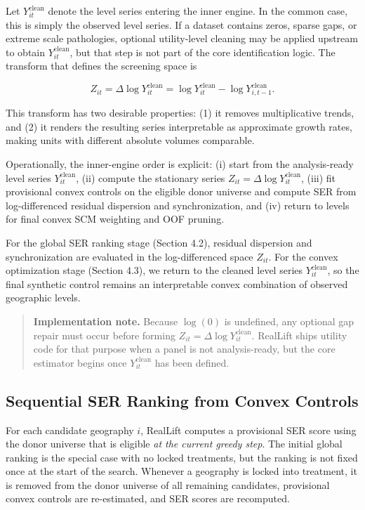 \documentclass[11pt]{article}
\begin{document}
Let $Y_{it}^{\mathrm{clean}}$ denote the level series entering the inner engine. In the common case, this is simply the observed level series. If a dataset contains zeros, sparse gaps, or extreme scale pathologies, optional utility-level cleaning may be applied upstream to obtain $Y_{it}^{\mathrm{clean}}$, but that step is not part of the core identification logic. The transform that defines the screening space is

\[
Z_{it} = \Delta \log Y_{it}^{\mathrm{clean}} = \log Y_{it}^{\mathrm{clean}} - \log Y_{i,t-1}^{\mathrm{clean}}.
\]

This transform has two desirable properties: (1) it removes multiplicative trends, and (2) it renders the resulting series interpretable as approximate growth rates, making units with different absolute volumes comparable.

Operationally, the inner-engine order is explicit: (i) start from the analysis-ready level series $Y_{it}^{\mathrm{clean}}$, (ii) compute the stationary series $Z_{it} = \Delta \log Y_{it}^{\mathrm{clean}}$, (iii) fit provisional convex controls on the eligible donor universe and compute SER from log-differenced residual dispersion and synchronization, and (iv) return to levels for final convex SCM weighting and OOF pruning.

For the global SER ranking stage (Section 4.2), residual dispersion and synchronization are evaluated in the log-differenced space $Z_{it}$. For the convex optimization stage (Section 4.3), we return to the cleaned level series $Y_{it}^{\mathrm{clean}}$, so the final synthetic control remains an interpretable convex combination of observed geographic levels.

\begin{quote}
\textbf{Implementation note.} Because $\log(0)$ is undefined, any optional gap repair must occur before forming $Z_{it} = \Delta \log Y_{it}^{\mathrm{clean}}$. RealLift ships utility code for that purpose when a panel is not analysis-ready, but the core estimator begins once $Y_{it}^{\mathrm{clean}}$ has been defined.
\end{quote}


\subsection{Sequential SER Ranking from Convex Controls}

For each candidate geography $i$, RealLift computes a provisional SER score using the donor universe that is eligible \emph{at the current greedy step}. The initial global ranking is the special case with no locked treatments, but the ranking is not fixed once at the start of the search. Whenever a geography is locked into treatment, it is removed from the donor universe of all remaining candidates, provisional convex controls are re-estimated, and SER scores are recomputed.
\end{document}
